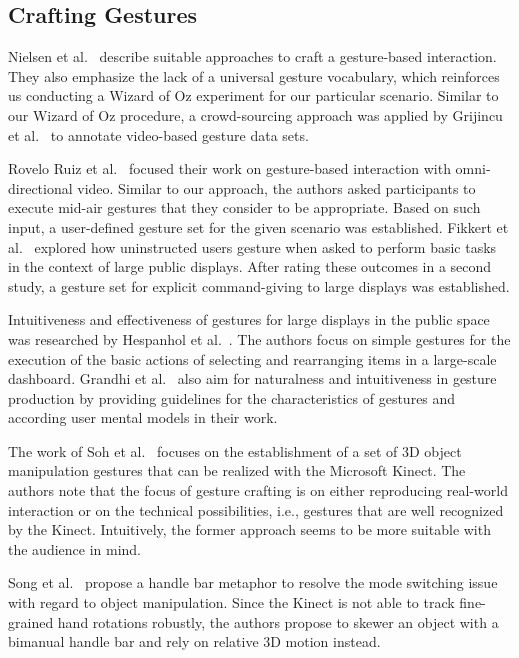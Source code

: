 \documentclass{sigchi}
\begin{document}
\subsection{Crafting Gestures}

Nielsen et al.~\cite{Nielsen03aprocedure} describe suitable approaches to craft a gesture-based interaction. They also emphasize the lack of a universal gesture vocabulary, which reinforces us conducting a Wizard of Oz experiment for our particular scenario. Similar to our Wizard of Oz procedure, a crowd-sourcing approach was applied by Grijincu et al.~\cite{Grijincu:2014:UIG:2669485.2669511} to annotate video-based gesture data sets.

Rovelo Ruiz et al.~\cite{RoveloRuiz:2014:MGI:2611222.2557113} focused their work on gesture-based interaction with omni-directional video. Similar to our approach, the authors asked participants to execute mid-air gestures that they consider to be appropriate. Based on such input, a user-defined gesture set for the given scenario was established. Fikkert et al.~\cite{Fikkert2010} explored how uninstructed users gesture when asked to perform basic tasks in the context of large public displays. After rating these outcomes in a second study, a gesture set for explicit command-giving to large displays was established.

Intuitiveness and effectiveness of gestures for large displays in the public space was researched by Hespanhol et al.~\cite{Hespanhol:2012:IIE:2307798.2307804}. The authors focus on simple gestures for the execution of the basic actions of selecting and rearranging items in a large-scale dashboard. Grandhi et al.~\cite{Grandhi:2011:UNI:1978942.1979061} also aim for naturalness and intuitiveness in gesture production by providing guidelines for the characteristics of gestures and according user mental models in their work.

The work of Soh et al.~\cite{Soh:2013:UOM:2534329.2534338} focuses on the establishment of a set of 3D object manipulation gestures that can be realized with the Microsoft Kinect. The authors note that the focus of gesture crafting is on either reproducing real-world interaction or on the technical possibilities, i.e., gestures that are well recognized by the Kinect. Intuitively, the former approach seems to be more suitable with the audience in mind.

Song et al.~\cite{Song:2012} propose a handle bar metaphor to resolve the mode switching issue with regard to object manipulation. Since the Kinect is not able to track fine-grained hand rotations robustly, the authors propose to skewer an object with a bimanual handle bar and rely on relative 3D motion instead.
\end{document}
